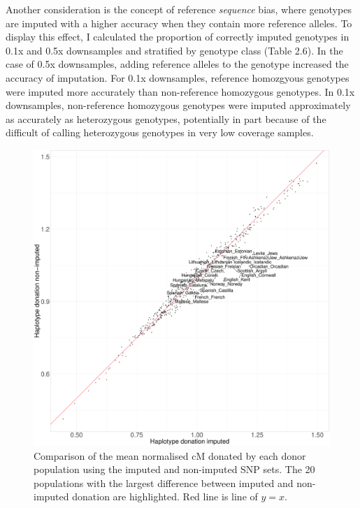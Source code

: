 {Another consideration is the concept of reference \textit{sequence} bias, where genotypes are imputed  with a higher accuracy when they contain more reference alleles. To display this effect, I calculated the proportion of correctly imputed genotypes in 0.1x and 0.5x downsamples and stratified by genotype class (Table 2.6). In the case of 0.5x downsamples, adding reference alleles to the genotype increased the accuracy of imputation. For 0.1x downsamples, reference homozgyous genotypes were imputed more accurately than non-reference homozygous genotypes. In 0.1x downsamples, non-reference homozygous genotypes were imputed approximately as accurately as heterozygous genotypes, potentially in part because of the difficult of calling heterozygous genotypes in very low coverage samples.




\begin{figure}[htp]
    \centering
    \includegraphics[width=1.0\textwidth]{../images/chapter1/donation_imputed_nonimputed.pdf}
    \caption{Comparison of the mean normalised cM donated by each donor population using the imputed and non-imputed SNP sets. The 20 populations with the largest difference between imputed and non-imputed donation are highlighted. Red line is line of $y=x$.}
    \label{fig:imputed_nonimputed_donation}
\end{figure}

}
